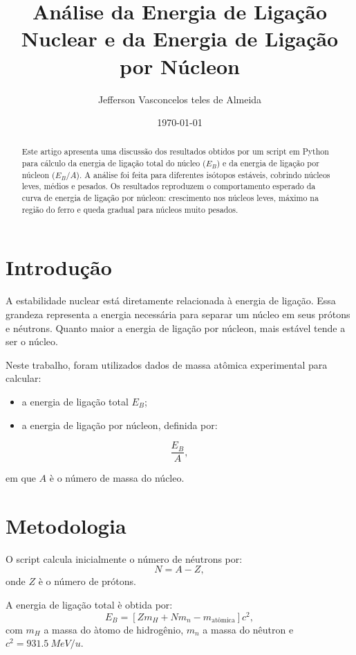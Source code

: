 \documentclass[12pt,a4paper]{article}
\title{An\'alise da Energia de Liga\c{c}\~ao Nuclear e da Energia de Liga\c{c}\~ao por N\'ucleon}
\author{Jefferson Vasconcelos teles de Almeida}
\date{\today}
\begin{document}
\maketitle

\begin{abstract}
Este artigo apresenta uma discuss\~ao dos resultados obtidos por um script em Python para c\'alculo da energia de liga\c{c}\~ao total do n\'ucleo ($E_B$) e da energia de liga\c{c}\~ao por n\'ucleon ($E_B/A$). A an\'alise foi feita para diferentes is\'otopos est\'aveis, cobrindo n\'ucleos leves, m\'edios e pesados. Os resultados reproduzem o comportamento esperado da curva de energia de liga\c{c}\~ao por n\'ucleon: crescimento nos n\'ucleos leves, m\'aximo na regi\~ao do ferro e queda gradual para n\'ucleos muito pesados.
\end{abstract}

\section{Introdu\c{c}\~ao}
A estabilidade nuclear est\'a diretamente relacionada \`a energia de liga\c{c}\~ao. Essa grandeza representa a energia necess\'aria para separar um n\'ucleo em seus pr\'otons e n\'eutrons. Quanto maior a energia de liga\c{c}\~ao por n\'ucleon, mais est\'avel tende a ser o n\'ucleo.

Neste trabalho, foram utilizados dados de massa at\^omica experimental para calcular:
\begin{itemize}
	\item a energia de liga\c{c}\~ao total $E_B$;
	\item a energia de liga\c{c}\~ao por n\'ucleon, definida por:
\end{itemize}

\begin{equation}
\frac{E_B}{A},
\end{equation}

em que $A$ \`e o n\'umero de massa do n\'ucleo.

\section{Metodologia}
O script calcula inicialmente o n\'umero de n\'eutrons por:
\begin{equation}
N = A - Z,
\end{equation}
onde $Z$ \`e o n\'umero de pr\'otons.

A energia de liga\c{c}\~ao total \`e obtida por:
\begin{equation}
E_B = \left[ Zm_H + Nm_n - m_{\text{at\^omica}} \right] c^2,
\end{equation}
com $m_H$ a massa do \`atomo de hidrog\^enio, $m_n$ a massa do n\^eutron e $c^2 = \SI{931.5}{MeV/u}$.
\end{document}
